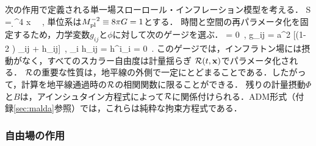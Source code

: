次の作用で定義される単一場スローロール・インフレーション模型を考える．
\beq
\label{equ:SRaction1}
S =  \int \d^4 x \, \, , %
\eeq
単位系は$ M_{\rm pl}^{-2} \equiv 8 \pi G = 1$とする．
時間と空間の再パラメータ化を固定するため，力学変数$g_{ij}$と$\phi$に対して次のゲージを選ぶ．
\beq
\delta \phi = 0\, , \qquad g_{ij} = a^2 [(1- 2 \R) \delta_{ij} + h_{ij}]\, , \qquad \partial_i h_{ij} = h^i_{i} = 0\, .
\eeq
このゲージでは，インフラトン場には摂動がなく，すべてのスカラー自由度は計量揺らぎ
${\cal R}(t, {\bf x})$でパラメータ化される．
${\cal R}$の重要な性質は，地平線の外側で一定にとどまることである．したがって，計算を地平線通過時の${\cal R}$の相関関数に限ることができる．
残りの計量摂動$\Phi$と$B$は，アインシュタイン方程式によって${\cal R}$に関係付けられる．ADM形式（付録\ref{sec:malda}参照）では，これらは純粋な拘束方程式である．

\subsubsection{自由場の作用}

